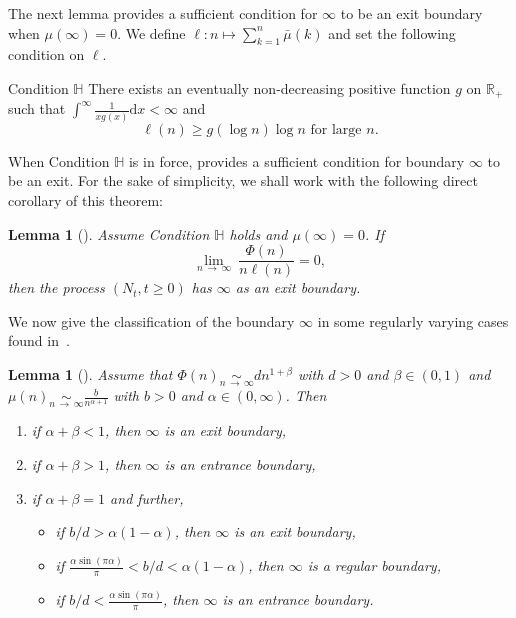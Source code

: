 \documentclass[10pt]{amsart}
\newtheorem{lemm}[theo]{Lemma}\newtheorem{prop}[theo]{Proposition}\newtheorem{coro}[theo]{Corollary}\newtheorem{conj}[theo]{Conjecture}
\theoremstyle{definition}\newtheorem{defi}[theo]{Definition}\newtheorem{rema}[theo]{Remark}\newtheorem{exam}[theo]{Example}\newtheorem{exem}[theo]{Example}\newtheorem{nota}[theo]{Notation}
\newcommand{\ddr}{\mathrm{d}}
\newcommand{\bbR}{\mathbb{R}}
\newcommand{\bbH}{\mathbb{H}}
\newcommand*{\romanenumi}{\renewcommand*{\theenumi}{\roman{enumi}}}
\begin{document}
The next lemma provides a sufficient condition for $\infty$ to be an exit boundary when $\mu(\infty)=0$. We define $\ell :n\mapsto \sum_{k=1}^{n}\bar{\mu}(k)$ and set the following condition on $\ell$.

\begin{enonce*}{Condition $\bbH$} 
There exists an eventually non-decreasing positive function $g$ on $\bbR_+$ such that $\int^{\infty}\frac{1}{xg(x)}\ddr x<\infty$ and
\begin{equation*}
\ell(n)\geq g(\log n)\log n \text{ for large } n.
\end{equation*}
\end{enonce*}

When Condition $\bbH$ is in force, \cite[Theorem~3.1]{explosion} provides a sufficient condition for boundary $\infty$ to be an exit. For the sake of simplicity, we shall work with the following direct corollary of this theorem:

\begin{lemm}[{\cite[Theorem~3.1, case $\rho=0$]{explosion}}]\label{suffcondexitN}
Assume Condition $\bbH$ holds and $\mu(\infty)=0$. If
\begin{equation*}\label{suffcondentrancePhi}
\underset{n\,\rightarrow\,\infty}{\lim}\ \frac{\Phi(n)}{n\ell(n)}=0,
\end{equation*}
then the process $(N_t,t\geq 0)$ has $\infty$ as an exit boundary.
\end{lemm}

We now give the classification of the boundary $\infty$ in some regularly varying cases found in~\cite{explosion}.

\pagebreak
\begin{lemm}[{\cite[Theorem~3.7]{explosion}}]\label{stablefragtheorem}
Assume that $\Phi(n)\underset{n\,\rightarrow\,\infty}{\sim} dn^{1+\beta}$ with $d>0$ and $\beta\in (0,1)$ and $\mu(n)\underset{n\,\rightarrow\,\infty}{\sim} \frac{b}{n^{\alpha+1}}$ with $b>0$ and $\alpha\in (0,\infty)$. Then
\begin{enumerate}\romanenumi
\item\label{lemm3.9.I} if $\alpha+\beta<1$, then $\infty$ is an exit boundary,
\vspace*{1mm}
\item\label{lemm3.9.II} if $\alpha+\beta>1$, then $\infty$ is an entrance boundary,
\vspace*{1mm}
\item\label{lemm3.9.III} if $\alpha+\beta=1$ and further,
\vspace*{2mm}
\begin{itemize}
\item if $b/d>\alpha(1-\alpha)$, then $\infty$ is an exit boundary,
\vspace*{2mm}
\item if $\frac{\alpha \sin(\pi \alpha)}{\pi}<b/d<\alpha(1-\alpha)$, then $\infty$ is a regular boundary,
\vspace*{2mm}
\item if $b/d<\frac{\alpha \sin(\pi \alpha)}{\pi}$, then $\infty$ is an entrance boundary.
\end{itemize}
\end{enumerate}
\end{lemm}
\end{document}
